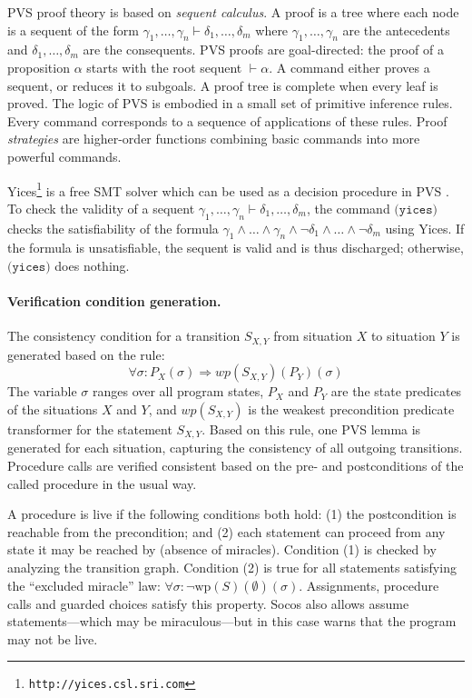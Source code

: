 \documentclass[english,submission]{eptcs}
\begin{document}
PVS proof theory is based on \emph{sequent calculus}. A proof is a
tree where each node is a sequent of the form $\gamma_{1},\dots,\gamma_{n}\vdash\delta_{1},\dots,\delta_{m}$
where $\gamma_{1},\dots,\gamma_{n}$ are the antecedents and
$\delta_{1},\dots,\delta_{m}$ are the consequents. PVS proofs are
goal-directed: the proof of a proposition $\alpha$ starts with the
root sequent $\vdash\alpha$. A command either proves a sequent, or
reduces it to subgoals. A proof tree is complete when every leaf is
proved. The logic of PVS is embodied in a small set of primitive inference
rules. Every command corresponds to a sequence of applications of
these rules. Proof \emph{strategies} are higher-order functions combining
basic commands into more powerful commands.

Yices\footnote{\texttt{http://yices.csl.sri.com}} is a free SMT solver which can be used as a decision procedure in
PVS \cite{yices}. To check the validity of a sequent $\gamma_{1},\dots,\gamma_{n}\vdash\delta_{1},\dots,\delta_{m}$,
the command \texttt{$\texttt{(yices)}$} checks the satisfiability
of the formula $\gamma_{1}\land\dots\land\gamma_{n}\land\neg\delta_{1}\land\dots\land\neg\delta_{m}$
using Yices. If the formula is unsatisfiable, the sequent is valid
and is thus discharged; otherwise, \texttt{$\texttt{(yices)}$} does
nothing.


\paragraph{Verification condition generation.}

The consistency condition for a transition $S_{X,Y}$ from situation
$X$ to situation $Y$ is generated based on the rule: 
\[
\forall\sigma : P_{X}(\sigma)\Rightarrow wp(S_{X,Y})(P_{Y})(\sigma)
\]
The variable $\sigma$ ranges over all program states, $P_{X}$ and
$P_{Y}$ are the state predicates of the situations $X$ and $Y$,
and $wp(S_{X,Y})$ is the weakest precondition predicate transformer
for the statement $S_{X,Y}$. Based on this rule, one PVS lemma is
generated for each situation, capturing the consistency of all outgoing
transitions. Procedure calls are verified consistent based on the
pre- and postconditions of the called procedure in the usual way.

A procedure is live if the following conditions both hold: (1) the
postcondition is reachable from the precondition; and (2) each statement
can proceed from any state it may be reached by (absence of miracles).
Condition (1) is checked by analyzing the transition graph. Condition
(2) is true for all statements satisfying the {}``excluded miracle''
law: $\forall\sigma : \neg\text{wp}(S)(\emptyset)(\sigma)$. Assignments,
procedure calls and guarded choices satisfy this property. Socos
also allows assume statements---which may be miraculous---but in this
case warns that the program may not be live.
\end{document}
